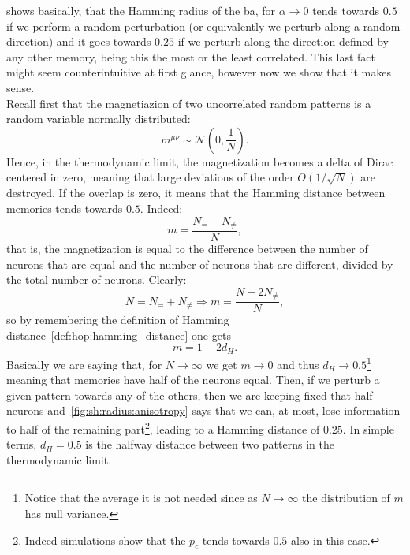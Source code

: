 \documentclass[\rootdir/main.tex]{subfiles}
\begin{document}
 shows basically, that the Hamming radius of the \acrlong{ba}, for $\alpha \to 0$ tends towards $0.5$ if we perform a random perturbation (or equivalently we perturb along a random direction) and it goes towards $0.25$ if we perturb along the direction defined by any other memory, being this the most or the least correlated. This last fact might seem counterintuitive at first glance, however now we show that it makes sense.\\
Recall first that the magnetiazion of two uncorrelated random patterns is a random variable normally distributed:
\begin{equation*}
    m^{\mu \nu} \sim \mathcal{N} \left(0, \frac{1}{N}\right).
\end{equation*}
Hence, in the thermodynamic limit, the magnetization becomes a delta of Dirac centered in zero, meaning that large deviations of the order $O\left(1/\sqrt{N}\right)$ are destroyed. If the overlap is zero, it means that the Hamming distance between memories tends towards $0.5$. Indeed:
\begin{equation*}
    m = \frac{N_{=} - N_{\neq}}{N},
\end{equation*}
that is, the magnetization is equal to the difference between the number of neurons that are equal and the number of neurons that are different, divided by the total number of neurons. Clearly:
\begin{equation}
    N = N_{=} + N_{\neq} \Rightarrow m = \frac{N -2 N_{\neq}}{N},
\end{equation}
so by remembering the definition of Hamming distance~\cref{def:hop:hamming_distance} one gets 
\begin{equation*}
    m = 1 - 2d_{H}.
\end{equation*}
Basically we are saying that, for $N \to \infty$ we get $m \to 0$ and thus $d_H \to 0.5$\footnote{Notice that the average it is not needed since as $N \to \infty$ the distribution of $m$ has null variance.} meaning that memories have half of the neurons equal. Then, if we perturb a given pattern towards any of the others, then we are keeping fixed that half neurons and~\cref{fig:sh:radius:anisotropy} says that we can, at most, lose information to half of the remaining part\footnote{Indeed simulations show that the $p_c$ tends towards $0.5$ also in this case.}, leading to a Hamming distance of $0.25$. In simple terms, $d_H = 0.5$ is the halfway distance between two patterns in the thermodynamic limit.
\clearpage
\end{document}
